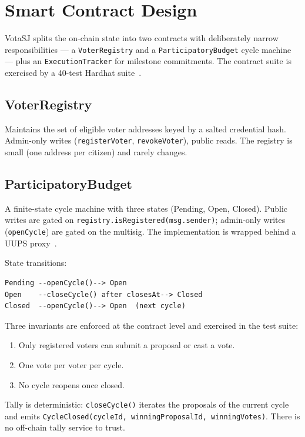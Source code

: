 \documentclass[12pt]{article}
\begin{document}
\section{Smart Contract Design}
\label{sec:contracts}

VotaSJ splits the on-chain state into two contracts with deliberately
narrow responsibilities --- a \texttt{VoterRegistry} and a
\texttt{ParticipatoryBudget} cycle machine --- plus an
\texttt{ExecutionTracker} for milestone commitments. The contract suite is
exercised by a 40-test Hardhat suite~\cite{hardhatdocs}.

\subsection{VoterRegistry}

Maintains the set of eligible voter addresses keyed by a salted credential
hash. Admin-only writes (\texttt{registerVoter}, \texttt{revokeVoter}),
public reads. The registry is small (one address per citizen) and rarely
changes.

\subsection{ParticipatoryBudget}

A finite-state cycle machine with three states (Pending, Open, Closed).
Public writes are gated on \texttt{registry.isRegistered(msg.sender)};
admin-only writes (\texttt{openCycle}) are gated on the multisig. The
implementation is wrapped behind a UUPS proxy~\cite{openzeppelin5}.

State transitions:

\begin{lstlisting}
Pending --openCycle()--> Open
Open    --closeCycle() after closesAt--> Closed
Closed  --openCycle()--> Open  (next cycle)
\end{lstlisting}

Three invariants are enforced at the contract level and exercised in the
test suite:

\begin{enumerate}
  \item Only registered voters can submit a proposal or cast a vote.
  \item One vote per voter per cycle.
  \item No cycle reopens once closed.
\end{enumerate}

Tally is deterministic: \texttt{closeCycle()} iterates the proposals of the
current cycle and emits \texttt{CycleClosed(cycleId, winningProposalId,
winningVotes)}. There is no off-chain tally service to trust.
\end{document}
